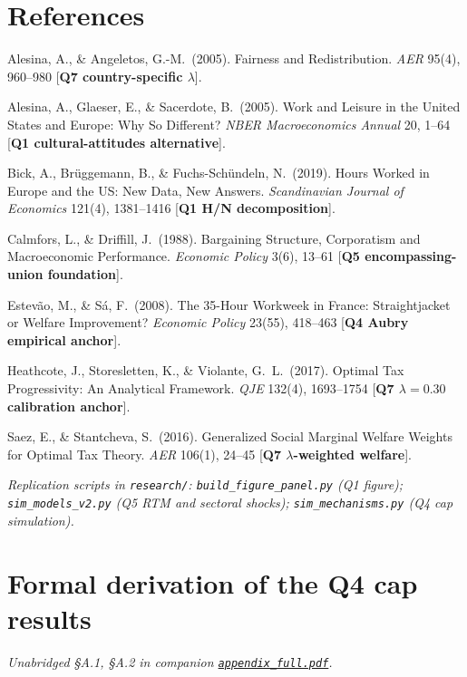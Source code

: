 \documentclass[a4paper,11pt]{article}
\begin{document}
\section*{References}
\begingroup
\setlength{\parindent}{-1.2em}\setlength{\leftskip}{1.2em}
\footnotesize

Alesina, A., \& Angeletos, G.-M.\ (2005). Fairness and Redistribution. \emph{AER} 95(4), 960--980 [\textbf{Q7 country-specific $\lambda$}].

Alesina, A., Glaeser, E., \& Sacerdote, B.\ (2005). Work and Leisure in the United States and Europe: Why So Different? \emph{NBER Macroeconomics Annual} 20, 1--64 [\textbf{Q1 cultural-attitudes alternative}].

Bick, A., Br\"uggemann, B., \& Fuchs-Sch\"undeln, N.\ (2019). Hours Worked in Europe and the US: New Data, New Answers. \emph{Scandinavian Journal of Economics} 121(4), 1381--1416 [\textbf{Q1 H/N decomposition}].

Calmfors, L., \& Driffill, J.\ (1988). Bargaining Structure, Corporatism and Macroeconomic Performance. \emph{Economic Policy} 3(6), 13--61 [\textbf{Q5 encompassing-union foundation}].

Estev\~ao, M., \& S\'a, F.\ (2008). The 35-Hour Workweek in France: Straightjacket or Welfare Improvement? \emph{Economic Policy} 23(55), 418--463 [\textbf{Q4 Aubry empirical anchor}].

Heathcote, J., Storesletten, K., \& Violante, G.\ L.\ (2017). Optimal Tax Progressivity: An Analytical Framework. \emph{QJE} 132(4), 1693--1754 [\textbf{Q7 $\lambda\!=\!0.30$ calibration anchor}].

Saez, E., \& Stantcheva, S.\ (2016). Generalized Social Marginal Welfare Weights for Optimal Tax Theory. \emph{AER} 106(1), 24--45 [\textbf{Q7 $\lambda$-weighted welfare}].

\medskip
\noindent\emph{Replication scripts in \texttt{research/}: \texttt{build\_figure\_panel.py} (Q1 figure); \texttt{sim\_models\_v2.py} (Q5 RTM and sectoral shocks); \texttt{sim\_mechanisms.py} (Q4 cap simulation).}
\endgroup

\section{Formal derivation of the Q4 cap results}\label{app:q4}

\noindent\emph{Unabridged \S A.1, \S A.2 in companion \href{https://github.com/AlessandroCaggia30/overworked-americans-takehome/blob/main/appendix_full.pdf}{\texttt{appendix\_full.pdf}}.}
\end{document}
